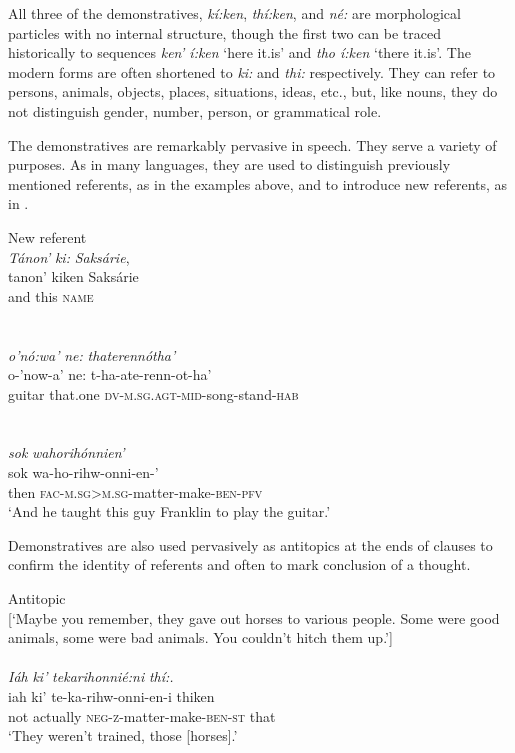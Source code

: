 \documentclass[output=paper]{langscibook}
\begin{document}
All three of the demonstratives, \textit{kí:ken}, \textit{thí:ken}, and \textit{né:} are morphological particles with no internal structure, though the first two can be traced historically to sequences \textit{ken’ í:ken} ‘here it.is’ and \textit{tho í:ken} ‘there it.is’. The modern forms are often shortened to \textit{ki:} and \textit{thi:} respectively. They can refer to persons, animals, objects, places, situations, ideas, etc., but, like nouns, they do not distinguish gender, number, person, or grammatical role.

The demonstratives are remarkably pervasive in speech. They serve a variety of purposes. As in many languages, they are used to distinguish previously mentioned referents, as in the examples above, and to introduce new referents, as in .

\ea%
\label{ex:mithun:11}
New referent\\
\glll \textit{Tánon’}  \textit{ki:}    \textit{Saksárie},\\
    tanon’    kiken  Saksárie\\
     and      this    \textsc{name}\\
~\\~\\
\glll \textit{o’nó:wa’}  \textit{ne:}        \textit{thaterennótha’}\\
o-’now-a’  ne:        t-ha-ate-renn-ot-ha’    \\
guitar      that.one    \textsc{dv-m.sg.agt-mid-}song-stand-\textsc{hab}\\
~\\~\\
\glll \textit{sok}    \textit{wahorihónnien’}\\
sok    wa-ho-rihw-onni-en-’\\
    then    \textsc{fac-m.sg>m.sg}{}-matter-make-\textsc{ben-pfv}\\
\glt ‘And he taught this guy Franklin to play the guitar.’\\
\z

Demonstratives are also used pervasively as antitopics at the ends of clauses to confirm the identity of referents and often to mark conclusion of a thought.

\ea%
    \label{ex:mithun:12}
Antitopic\\
{[}‘Maybe you remember, they gave out horses to various people.   Some were good animals, some were bad animals. You couldn’t   hitch them up.’]\\
~\\
\glll \textit{Iáh}    \textit{ki’}      \textit{tekarihonnié:ni}              \textit{thí:.}\\
iah    ki’      te-ka-rihw-onni-en-i        thiken\\
not    actually  \textsc{neg-z}{}-matter-make-\textsc{ben-st}  that\\
\glt ‘They weren’t trained, those [horses].’\\
\z
\end{document}

